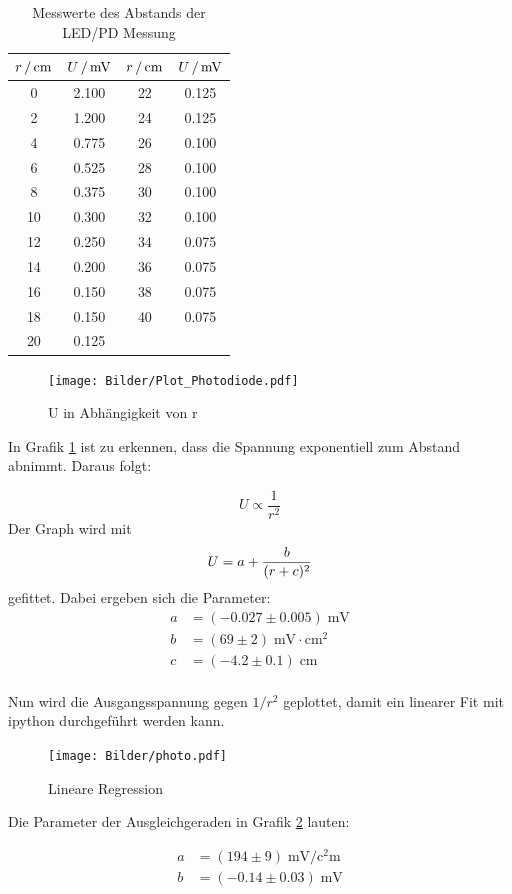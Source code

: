 \begin{table}[H]
  \centering
    \begin{tabular}{cccc}
      \toprule
      {$r \,/ \,\si{\centi\meter}$} & {$U \, / \,\si{\milli\volt}$} & {$r \,/\,\si{\centi\meter}$} & {$U \,/ \,\si{\milli\volt}$} \\
      \midrule
       0  &  2.100   &   22  &  0.125 \\
       2  &  1.200   &   24  &  0.125 \\
       4  &  0.775   &   26  &  0.100 \\
       6  &  0.525   &   28  &  0.100 \\
       8  &  0.375   &   30  &  0.100 \\
      10  &  0.300   &   32  &  0.100 \\
      12  &  0.250   &   34  &  0.075 \\
      14  &  0.200   &   36  &  0.075 \\
      16  &  0.150   &   38  &  0.075 \\
      18  &  0.150   &   40  &  0.075 \\
      20  &  0.125   &  \hrulefill     &  \hrulefill      \\
      \bottomrule
    \end{tabular}
    \caption{Messwerte des Abstands der LED/PD Messung}
    \label{tab:licht}
\end{table}

\begin{figure}[H]
  \centering
  \texttt{[image: Bilder/Plot\_Photodiode.pdf]}
  \caption{U in Abhängigkeit von r}
  \label{fig:led}
\end{figure}

In Grafik \ref{fig:led} ist zu erkennen, dass die Spannung exponentiell zum Abstand
abnimmt. Daraus folgt:

\begin{equation*}
  U \propto \frac{1}{r^2}
\end{equation*}
Der Graph wird mit
\begin{equation}
U = a + \frac{b}{(r+c)^2} \notag
\end{equation}
gefittet.
Dabei ergeben sich die Parameter:
\begin{align*}
  a &= (-0.027 ± 0.005) \; \si{\milli\volt} \\
  b &= (69 ± 2)    \;   \si{\milli\volt\cdot\centi\square\meter}        \\
  c &= (-4.2 ± 0.1) \; \si{\centi\meter}
\end{align*}
\\
Nun wird die Ausgangsspannung gegen $1/r^2$ geplottet, damit ein linearer Fit mit ipython durchgeführt
werden kann.

\begin{figure}[!h]
\centering
\texttt{[image: Bilder/photo.pdf]}
\caption{Lineare Regression}
\label{fig:lin}
\end{figure}

Die Parameter der Ausgleichgeraden in Grafik \ref{fig:lin} lauten:

\begin{align*}
    a &= (194 ± 9) \; \si{\milli\volt\per\square\centi\meter} \\
    b &= (-0.14 ± 0.03) \; \si{\milli\volt}
\end{align*}
